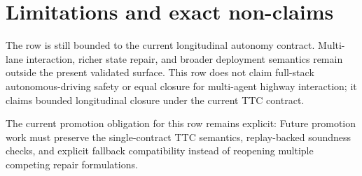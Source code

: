 \section{{Limitations and exact non-claims}}
The row is still bounded to the current longitudinal autonomy contract. Multi-lane interaction, richer state repair, and broader deployment semantics remain outside the present validated surface. This row does not claim full-stack autonomous-driving safety or equal closure for multi-agent highway interaction; it claims bounded longitudinal closure under the current TTC contract.

The current promotion obligation for this row remains explicit: Future promotion work must preserve the single-contract TTC semantics, replay-backed soundness checks, and explicit fallback compatibility instead of reopening multiple competing repair formulations.
